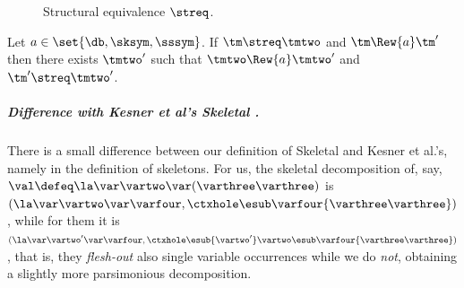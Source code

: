 
\begin{figure}[t!]
\centering
{}
\caption{Structural equivalence $\streq$.}
\label{fig:structural-equivalence}
\end{figure}
\begin{proposition}
\label{prop:streq-is-a-strong-bisim}
Let $a\in\set{\db,\sksym,\sssym}$. If $\tm \streq \tmtwo$ and $\tm \Rew{a} \tm'$ then there exists $\tmtwo'$ such that $\tmtwo \Rew{a} \tmtwo'$ and $\tm' \streq \tmtwo'$.
\end{proposition}

\subparagraph{Difference with Kesner et al's Skeletal \cbneed \cite{DBLP:journals/lmcs/KesnerPV24}.}
There is a small difference between our definition of Skeletal \cbneed and Kesner et al.'s, namely in the definition of skeletons. For us, the skeletal decomposition of, say, $\val \defeq\la\var\vartwo\var(\varthree\varthree)$ is $(\la\var\vartwo\var\varfour, \ctxhole\esub\varfour{\varthree\varthree})$, while for them it is $(\la\var\vartwo'\var\varfour, \ctxhole\esub{\vartwo'}\vartwo\esub\varfour{\varthree\varthree})$, that is, they \emph{flesh-out} also single variable occurrences while we do \emph{not}, obtaining a slightly more parsimonious decomposition.

